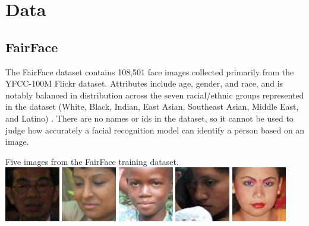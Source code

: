 \section{Data}

\subsection{FairFace}
The FairFace dataset contains 108,501 face
images collected primarily from the YFCC-100M Flickr dataset. Attributes include age, gender, and race, and is notably balanced in distribution across the seven racial/ethnic groups represented in the dataset (White, Black, Indian, East Asian, Southeast Asian,
Middle East, and Latino)  \cite{krkkinen2019fairface}. There are no names or ids in the dataset, so it cannot be used to judge how accurately a facial recognition model can identify a person based on an image.
\begin{center} 
Five images from the FairFace training dataset.
\\
{\includegraphics[width=0.18\textwidth]{figure/fairface_1.jpg}}
{\includegraphics[width=0.18\textwidth]{figure/fairface_2.jpg}}
{\includegraphics[width=0.18\textwidth]{figure/fairface_3.jpg}}
{\includegraphics[width=0.18\textwidth]{figure/fairface_4.jpg}}
{\includegraphics[width=0.18\textwidth]{figure/fairface_5.jpg}}
\end{center}
